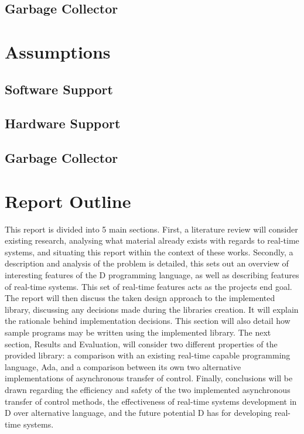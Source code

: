 \subsection{Garbage Collector}

\section{Assumptions} %
\subsection{Software Support}
\subsection{Hardware Support}
\subsection{Garbage Collector}


\section{Report Outline} %
This report is divided into 5 main sections. 
First, a literature review will 
consider existing research, analysing what material already exists with regards 
to real-time systems, and situating this report within the context of these works. 
Secondly, a description and analysis of the problem is detailed, this sets out      %
an overview of interesting features of the D programming language, as well as 
describing features of real-time systems. This set of real-time features acts as 
the projects end goal. 
The report will then discuss the taken design approach to the implemented library,
discussing any decisions made during the libraries creation. It will explain the 
rationale behind implementation decisions. This section will also detail 
how sample programs may be written using the implemented library. 
The next section, Results and Evaluation, will consider two different properties 
of the provided library: a comparison with an existing real-time capable programming 
language, Ada, and a comparison between its own two alternative implementations 
of asynchronous transfer of control. 
Finally, conclusions will be drawn regarding the efficiency and safety of the 
two implemented asynchronous transfer of control methods, the effectiveness of 
real-time systems development in D over alternative language, and the future 
potential D has for developing real-time systems.

